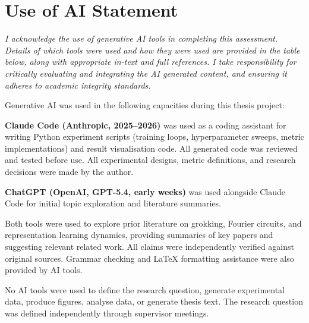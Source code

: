 \documentclass[12pt,openany,a4paper]{book}
\begin{document}
\chapter{Use of AI Statement}

\emph{I acknowledge the use of generative AI tools in completing this
assessment. Details of which tools were used and how they were used are
provided in the table below, along with appropriate in-text and full
references. I take responsibility for critically evaluating and
integrating the AI generated content, and ensuring it adheres to
academic integrity standards.}

\bigskip

Generative AI was used in the following capacities during this thesis project:

\textbf{Claude Code (Anthropic, 2025--2026)} was used as a coding assistant for writing Python experiment scripts (training loops, hyperparameter sweeps, metric implementations) and result visualisation code. All generated code was reviewed and tested before use. All experimental designs, metric definitions, and research decisions were made by the author.

\textbf{ChatGPT (OpenAI, GPT-5.4, early weeks)} was used alongside Claude Code for initial topic exploration and literature summaries.

Both tools were used to explore prior literature on grokking, Fourier circuits, and representation learning dynamics, providing summaries of key papers and suggesting relevant related work. All claims were independently verified against original sources. Grammar checking and LaTeX formatting assistance were also provided by AI tools.

No AI tools were used to define the research question, generate experimental data, produce figures, analyse data, or generate thesis text. The research question was defined independently through supervisor meetings.

\bigskip
\end{document}
